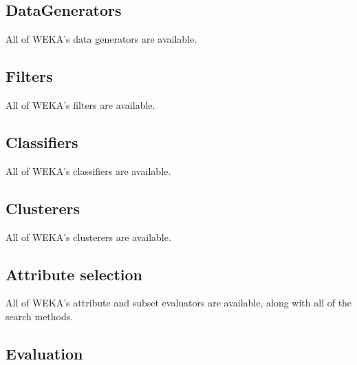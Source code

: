 \subsection{DataGenerators} All of WEKA's data generators are available.


\subsection{Filters} All of WEKA's filters are available.

\subsection{Classifiers} All of WEKA's classifiers are available.

\subsection{Clusterers} All of WEKA's clusterers are available.

\subsection{Attribute selection} All of WEKA's attribute and subset evaluators
are available, along with all of the search methods.

\subsection{Evaluation}

